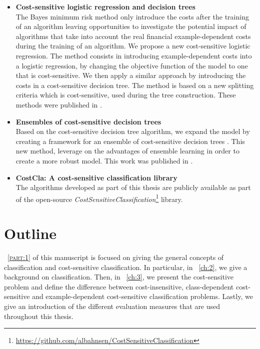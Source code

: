 \begin{itemize}
\item \textbf{Cost-sensitive logistic regression and decision trees} \\
  The Bayes minimum risk method only introduce the costs after the training of an algorithm leaving
  opportunities to investigate the potential impact of algorithms that take into account the real 
  financial example-dependent costs during the training of an algorithm. We propose a new 
  cost-sensitive logistic regression. The   method consists in introducing example-dependent costs 
  into a logistic regression, by  changing   the objective function of the model to one that is  
  cost-sensitive. We then apply a   similar approach by introducing the costs in a cost-sensitive 
  decision tree. The method is based on a new splitting criteria which is cost-sensitive, used 
  during the tree construction. 
  These methods were published in \citep{CorreaBahnsen2014b,CorreaBahnsen2015}.
  
\item \textbf{Ensembles of cost-sensitive decision trees} \\
  Based on the cost-sensitive decision tree algorithm, we expand the model by creating a framework 
  for an ensemble of cost-sensitive decision trees . This new 
  method, leverage on the advantages of ensemble learning in order to create a more robust model.
  This work was published in \citep{CorreaBahnsen2015b}.
  
\item \textbf{CostCla: A cost-sensitive classification library} \\
  The algorithms developed as part of this thesis are publicly available as part of the open-source 
  \textit{CostSensitiveClassification}\footnote{
  \url{https://github.com/albahnsen/CostSensitiveClassification}} library.
  
\end{itemize}

\newpage

\section{Outline}

\partname{~\textsc{\ref{part:1}}} of this manuscript is focused on giving the general concepts of 
classification and cost-sensitive classification. In particular, in \chaptername{~\ref{ch:2}}, we 
give a background on classification. Then, in \chaptername{~\ref{ch:3}}, we present 
the cost-sensitive problem and define the difference between 
cost-insensitive, class-dependent cost-sensitive and example-dependent cost-sensitive 
classification problems. Lastly, we give an introduction of the different evaluation measures 
that are used throughout this thesis.

